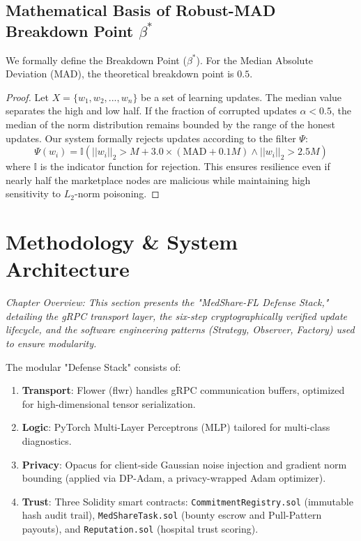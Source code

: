 \documentclass[10pt, a4paper, twocolumn]{article}
\begin{document}
\subsection{Mathematical Basis of Robust-MAD Breakdown Point \texorpdfstring{$\beta^*$}{beta*}}
We formally define the Breakdown Point ($\beta^*$). For the Median Absolute Deviation (MAD), the theoretical breakdown point is $0.5$.
\begin{proof}
Let $X = \{w_1, w_2, ..., w_n\}$ be a set of learning updates. The median value separates the high and low half. If the fraction of corrupted updates $\alpha < 0.5$, the median of the norm distribution remains bounded by the range of the honest updates. Our system formally rejects updates according to the filter $\Psi$:
\begin{equation}
    \Psi(w_i) = \mathbb{I}(||w_i||_2 > M + 3.0 \times (\text{MAD} + 0.1M) \land ||w_i||_2 > 2.5M)
\end{equation}
where $\mathbb{I}$ is the indicator function for rejection. This ensures resilience even if nearly half the marketplace nodes are malicious while maintaining high sensitivity to $L_2$-norm poisoning.
\end{proof}

\section{Methodology \& System Architecture}

\textit{Chapter Overview: This section presents the "MedShare-FL Defense Stack," detailing the gRPC transport layer, the six-step cryptographically verified update lifecycle, and the software engineering patterns (Strategy, Observer, Factory) used to ensure modularity.}

The modular "Defense Stack" consists of:
\begin{enumerate}
    \item \textbf{Transport}: Flower (flwr) \cite{beutel2020} handles gRPC communication buffers, optimized for high-dimensional tensor serialization.
    \item \textbf{Logic}: PyTorch Multi-Layer Perceptrons (MLP) tailored for multi-class diagnostics.
    \item \textbf{Privacy}: Opacus for client-side Gaussian noise injection and gradient norm bounding (applied via DP-Adam, a privacy-wrapped Adam optimizer).
    \item \textbf{Trust}: Three Solidity smart contracts: \texttt{CommitmentRegistry.sol} (immutable hash audit trail), \texttt{MedShareTask.sol} (bounty escrow and Pull-Pattern payouts), and \texttt{Reputation.sol} (hospital trust scoring).
\end{enumerate}
\end{document}
